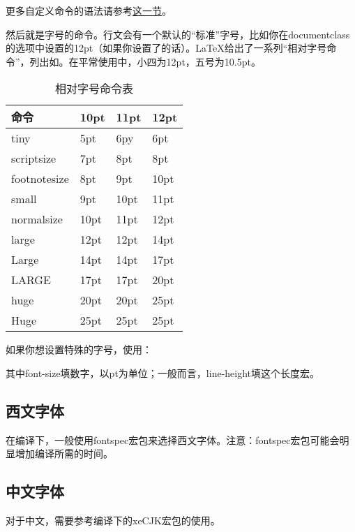 {更多自定义命令的语法请参考\hyperref[sec:newcommand]{这一节}。

然后就是字号的命令。行文会有一个默认的“标准”字号，比如你在documentclass的选项中设置的12pt（如果你设置了的话）。\LaTeX 给出了一系列“相对字号命令”，列出如。在平常使用中，小四为12pt，五号为10.5pt。
\begin{table}[!ht]
\centering
\label{tab:fontsize}
\caption{相对字号命令表}
\begin{tabular}{|>{\ttfamily\char92}l|*{3}{l|}}
\hline
命令         & 10pt & 11pt & 12pt \\
\hline
tiny         & 5pt  & 6py  & 6pt  \\
scriptsize   & 7pt  & 8pt  & 8pt  \\
footnotesize & 8pt  & 9pt  & 10pt \\
small        & 9pt  & 10pt & 11pt \\
normalsize   & 10pt & 11pt & 12pt \\
large        & 12pt & 12pt & 14pt \\
Large        & 14pt & 14pt & 17pt \\
LARGE        & 17pt & 17pt & 20pt \\
huge         & 20pt & 20pt & 25pt \\
Huge         & 25pt & 25pt & 25pt \\
\hline
\end{tabular}
\end{table}

如果你想设置特殊的字号，使用：
\begin{latex}{}
\end{latex}

其中font-size填数字，以pt为单位；一般而言，line-height填\latexline{\\baselineskip}这个长度宏。

\subsection{西文字体}
在\xelatex 编译下，一般使用fontspec宏包来选择西文字体。注意：fontspec宏包可能会明显增加编译所需的时间。
\begin{latex}{}
\usepackage{fontspec}
\end{latex}

\subsection{中文字体}
对于中文，需要参考\xelatex 编译下的xeCJK宏包的使用。

}
